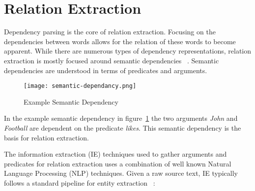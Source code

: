 \documentclass[bsc,frontabs,twoside,singlespacing,parskip,deptreport]{infthesis}     %
\begin{document}
\section{Relation Extraction}\label{sec:IE-bg}
Dependency parsing is the core of relation extraction. Focusing on the dependencies between words allows for the relation of these words to become apparent.
While there are numerous types of dependency representations, relation extraction is mostly focused around semantic dependencies ~\cite{mcclosky2011event}.
Semantic dependencies are understood in terms of predicates and arguments.
\begin{figure}[H]
  \centering
  \texttt{[image: semantic-dependancy.png]}
  \caption{Example Semantic Dependency}
  \label{fig:semantic-dependancy}
\end{figure}

In the example semantic dependency in figure~\ref{fig:semantic-dependancy} the two arguments \textit{John} and \textit{Football} are dependent
on the predicate \textit{likes}. This semantic dependency is the basis for relation extraction.


The information extraction (IE) techniques used to gather arguments and predicates for relation extraction uses a combination
of well known Natural Language Processing (NLP) techniques. 
Given a raw source text, IE typically follows a standard pipeline for entity extraction ~\cite{bontcheva2013twitie}:\\
\end{document}
